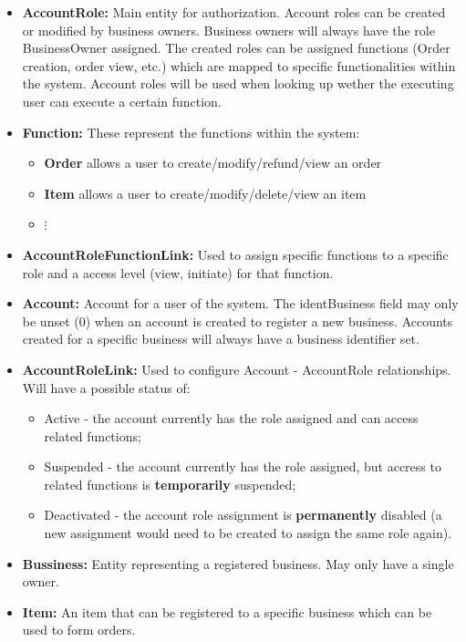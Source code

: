 \documentclass[11pt,a4paper,pdftex]{article}
\begin{document}
\begin{itemize}
    \item \textbf{AccountRole:} Main entity for authorization. Account roles can be created or modified by business owners. Business owners will always have the role BusinessOwner assigned. The created roles can be assigned functions (Order creation, order view, etc.) which are mapped to specific functionalities within the system. Account roles will be used when looking up wether the executing user can execute a certain function.
    \item \textbf{Function:} These represent the functions within the system:
    \begin{itemize}
        \item \textbf{Order} allows a user to create/modify/refund/view an order
        \item \textbf{Item} allows a user to create/modify/delete/view an item
        \item $\vdots$
    \end{itemize}
    \item \textbf{AccountRoleFunctionLink:} Used to assign specific functions to a specific role and a access level (view, initiate) for that function.
    \item \textbf{Account:} Account for a user of the system. The identBusiness field may only be unset (0) when an account is created to register a new business. Accounts created for a specific business will always have a business identifier set.
    \item \textbf{AccountRoleLink:} Used to configure Account - AccountRole relationships. Will have a possible status of: 
    \begin{itemize}
        \item Active - the account currently has the role assigned and can access related functions;
        \item Suspended - the account currently has the role assigned, but accress to related functions is \textbf{temporarily} suspended;
        \item Deactivated - the account role assignment is \textbf{permanently} disabled (a new assignment would need to be created to assign the same role again).
    \end{itemize}
    \item \textbf{Bussiness:} Entity representing a registered business. May only have a single owner.
    \item \textbf{Item:} An item that can be registered to a specific business which can be used to form orders.

\end{itemize}
\end{document}
